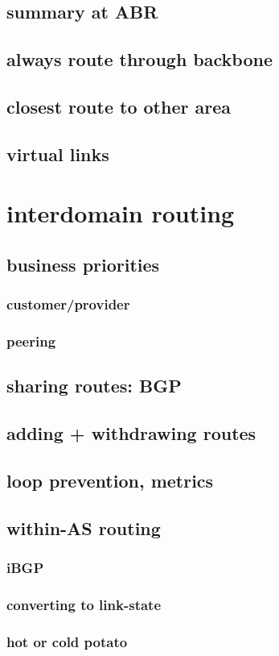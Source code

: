 \subsection{summary at ABR}

\subsection{always route through backbone}

\subsection{closest route to other area}

\subsection{virtual links}

\section{interdomain routing}

\subsection{business priorities}

\subsubsection{customer/provider}

\subsubsection{peering}

\subsection{sharing routes: BGP}

\subsection{adding + withdrawing routes}

\subsection{loop prevention, metrics}

\subsection{within-AS routing}

\subsubsection{iBGP}


\subsubsection{converting to link-state}

\subsubsection{hot or cold potato}

